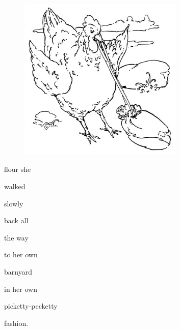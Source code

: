 \documentclass[letterpaper, 10pt, openany]{memoir}
\begin{document}
\begin{figure}
	\includegraphics[width=0.7\textwidth]{image_025_2.jpg}
\end{figure}

flour she

\vspace{\onelineskip}

walked

\vspace{\onelineskip}

slowly

\vspace{\onelineskip}

back all

\vspace{\onelineskip}

the way

\vspace{\onelineskip}

to her own

\vspace{\onelineskip}

barnyard

\vspace{\onelineskip}

in her own

\vspace{\onelineskip}

picketty-pecketty

\vspace{\onelineskip}

fashion.
\end{document}
